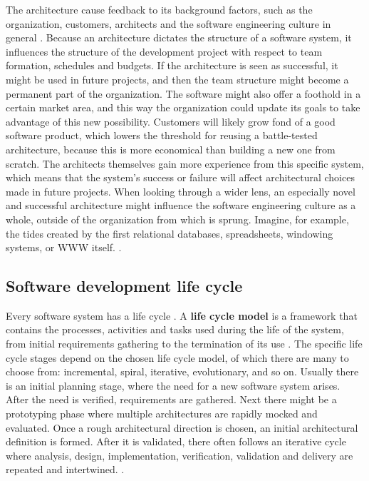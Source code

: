 \documentclass[utf8,english]{gradu3}
\begin{document}
The architecture cause feedback to its background factors, such as the
organization, customers, architects and the software engineering culture in
general \parencite{Bass1998}. Because an architecture dictates the structure of
a software system, it influences the structure of the development project with
respect to team formation, schedules and budgets. If the architecture is seen as
successful, it might be used in future projects, and then the team structure
might become a permanent part of the organization. The software might also offer
a foothold in a certain market area, and this way the organization could update
its goals to take advantage of this new possibility. Customers will likely grow
fond of a good software product, which lowers the threshold for reusing a
battle-tested architecture, because this is more economical than building a new
one from scratch. The architects themselves gain more experience from this
specific system, which means that the system's success or failure will affect
architectural choices made in future projects. When looking through a wider
lens, an especially novel and successful architecture might influence the
software engineering culture as a whole, outside of the organization from which
is sprung. Imagine, for example, the tides created by the first relational
databases, spreadsheets, windowing systems, or WWW itself.
\parencite[10-11]{Bass1998}.


\subsection{Software development life cycle}

Every software system has a life cycle \parencite[17]{IEEE12207}. A \textbf{life
  cycle model} is a framework that contains the processes, activities and tasks
used during the life of the system, from initial requirements gathering to the
termination of its use \parencite[3]{IEEE42010}. The specific life cycle stages
depend on the chosen life cycle model, of which there are many to choose from:
incremental, spiral, iterative, evolutionary, and so on. Usually there is an
initial planning stage, where the need for a new software system arises. After
the need is verified, requirements are gathered. Next there might be a
prototyping phase where multiple architectures are rapidly mocked and evaluated.
Once a rough architectural direction is chosen, an initial architectural
definition is formed. After it is validated, there often follows an iterative
cycle where analysis, design, implementation, verification, validation and
delivery are repeated and intertwined. \parencite[18]{IEEE12207}.
\end{document}
